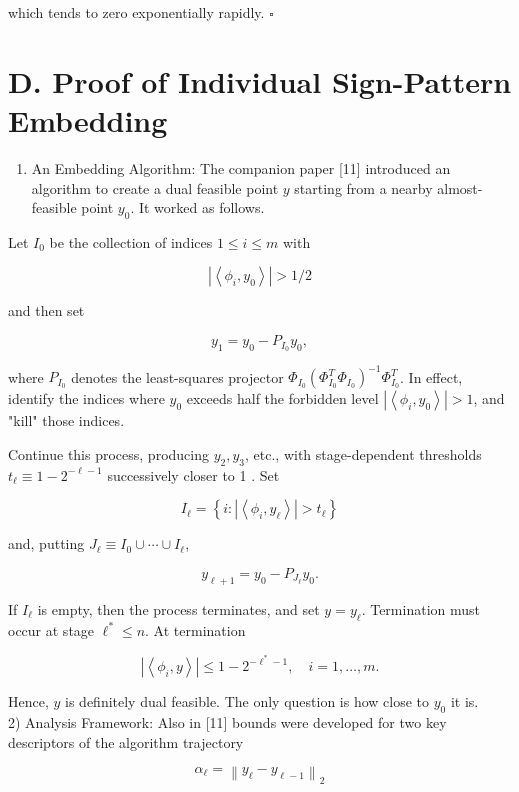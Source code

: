 \documentclass[10pt]{article}
\begin{document}
which tends to zero exponentially rapidly. \(\square\)

\section*{D. Proof of Individual Sign-Pattern Embedding}
\begin{enumerate}
  \item An Embedding Algorithm: The companion paper [11] introduced an algorithm to create a dual feasible point $y$ starting from a nearby almost-feasible point $y_{0}$. It worked as follows.
\end{enumerate}

Let $I_{0}$ be the collection of indices $1 \leq i \leq m$ with

$$
\left|\left\langle\phi_{i}, y_{0}\right\rangle\right|>1 / 2
$$

and then set

$$
y_{1}=y_{0}-P_{I_{0}} y_{0},
$$

where $P_{I_{0}}$ denotes the least-squares projector $\Phi_{I_{0}}\left(\Phi_{I_{0}}^{T} \Phi_{I_{0}}\right)^{-1} \Phi_{I_{0}}^{T}$. In effect, identify the indices where $y_{0}$ exceeds half the forbidden level $\left|\left\langle\phi_{i}, y_{0}\right\rangle\right|>1$, and "kill" those indices.

Continue this process, producing $y_{2}, y_{3}$, etc., with stage-dependent thresholds $t_{\ell} \equiv 1-2^{-\ell-1}$ successively closer to 1 . Set

$$
I_{\ell}=\left\{i:\left|\left\langle\phi_{i}, y_{\ell}\right\rangle\right|>t_{\ell}\right\}
$$

and, putting $J_{\ell} \equiv I_{0} \cup \cdots \cup I_{\ell}$,

$$
y_{\ell+1}=y_{0}-P_{J_{\ell}} y_{0} .
$$

If $I_{\ell}$ is empty, then the process terminates, and set $y=y_{\ell}$. Termination must occur at stage $\ell^{*} \leq n$. At termination

$$
\left|\left\langle\phi_{i}, y\right\rangle\right| \leq 1-2^{-\ell^{*}-1}, \quad i=1, \ldots, m .
$$

Hence, $y$ is definitely dual feasible. The only question is how close to $y_{0}$ it is.\\[0pt]
2) Analysis Framework: Also in [11] bounds were developed for two key descriptors of the algorithm trajectory

$$
\alpha_{\ell}=\left\|y_{\ell}-y_{\ell-1}\right\|_{2}
$$
\end{document}
